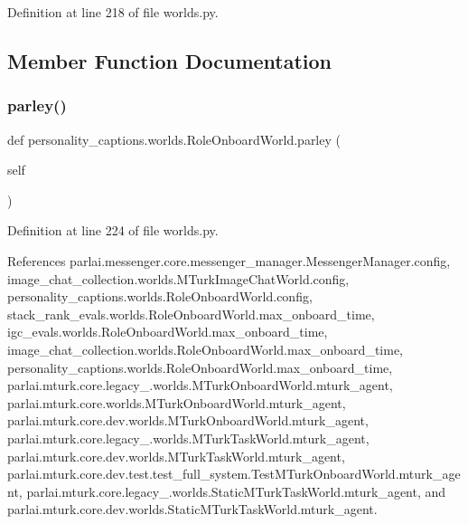 Definition at line 218 of file worlds.\+py.



\subsection{Member Function Documentation}
\mbox{\label{classpersonality__captions_1_1worlds_1_1RoleOnboardWorld_aa3a44bacf2761f813788a08dd918965d}} 
\subsubsection{\texorpdfstring{parley()}{parley()}}
{\footnotesize\ttfamily def personality\+\_\+captions.\+worlds.\+Role\+Onboard\+World.\+parley (\begin{DoxyParamCaption}\item[{}]{self }\end{DoxyParamCaption})}



Definition at line 224 of file worlds.\+py.



References parlai.\+messenger.\+core.\+messenger\+\_\+manager.\+Messenger\+Manager.\+config, image\+\_\+chat\+\_\+collection.\+worlds.\+M\+Turk\+Image\+Chat\+World.\+config, personality\+\_\+captions.\+worlds.\+Role\+Onboard\+World.\+config, stack\+\_\+rank\+\_\+evals.\+worlds.\+Role\+Onboard\+World.\+max\+\_\+onboard\+\_\+time, igc\+\_\+evals.\+worlds.\+Role\+Onboard\+World.\+max\+\_\+onboard\+\_\+time, image\+\_\+chat\+\_\+collection.\+worlds.\+Role\+Onboard\+World.\+max\+\_\+onboard\+\_\+time, personality\+\_\+captions.\+worlds.\+Role\+Onboard\+World.\+max\+\_\+onboard\+\_\+time, parlai.\+mturk.\+core.\+legacy\+\_.\+worlds.\+M\+Turk\+Onboard\+World.\+mturk\+\_\+agent, parlai.\+mturk.\+core.\+worlds.\+M\+Turk\+Onboard\+World.\+mturk\+\_\+agent, parlai.\+mturk.\+core.\+dev.\+worlds.\+M\+Turk\+Onboard\+World.\+mturk\+\_\+agent, parlai.\+mturk.\+core.\+legacy\+\_.\+worlds.\+M\+Turk\+Task\+World.\+mturk\+\_\+agent, parlai.\+mturk.\+core.\+dev.\+worlds.\+M\+Turk\+Task\+World.\+mturk\+\_\+agent, parlai.\+mturk.\+core.\+dev.\+test.\+test\+\_\+full\+\_\+system.\+Test\+M\+Turk\+Onboard\+World.\+mturk\+\_\+agent, parlai.\+mturk.\+core.\+legacy\+\_.\+worlds.\+Static\+M\+Turk\+Task\+World.\+mturk\+\_\+agent, and parlai.\+mturk.\+core.\+dev.\+worlds.\+Static\+M\+Turk\+Task\+World.\+mturk\+\_\+agent.



